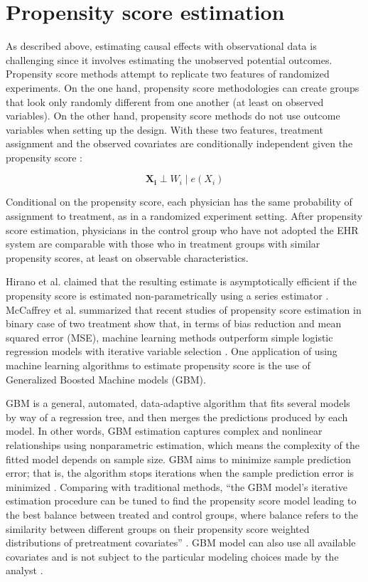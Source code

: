\documentclass[12pt]{report}
\begin{document}
\section{Propensity score estimation}
As described above, estimating causal effects with observational data is challenging since it involves estimating the unobserved potential outcomes. Propensity score methods attempt to replicate two features of randomized experiments. On the one hand, propensity score methodologies can create groups that look only randomly different from one another (at least on observed variables). On the other hand, propensity score methods do not use outcome variables when setting up the design. With these two features, treatment assignment and the observed covariates are conditionally independent given the propensity score \citep{guo2014propensity}:

\begin{equation*}
\boldsymbol{X_i} \perp W_i \mid e(X_i)
\end{equation*}

Conditional on the propensity score, each physician has the same probability of assignment to treatment, as in a randomized experiment setting. After propensity score estimation, physicians in the control group who have not adopted the EHR system are comparable with those who in treatment groups with similar propensity scores, at least on observable characteristics. 

Hirano et al. claimed that the resulting estimate is asymptotically efficient if the propensity score is estimated non-parametrically using a series estimator \citep{hirano2003efficient}. McCaffrey et al. summarized that recent studies of propensity score estimation in binary case of two treatment show that, in terms of bias reduction and mean squared error (MSE), machine learning methods outperform simple logistic regression models with iterative variable selection \citep{mccaffrey2013tutorial}. One application of using machine learning algorithms to estimate propensity score is the use of Generalized Boosted Machine models (GBM).

GBM is a general, automated, data-adaptive algorithm that fits several models by way of a regression tree, and then merges the predictions produced by each model. In other words, GBM estimation captures complex and nonlinear relationships using nonparametric estimation, which means the complexity of the fitted model depends on sample size. GBM aims to minimize sample prediction error; that is, the algorithm stops iterations when the sample prediction error is minimized \citep{guo2014propensity}. Comparing with traditional methods, ``the GBM model's iterative estimation procedure can be tuned to find the propensity score model leading to the best balance between treated and control groups, where balance refers to the similarity between different groups on their propensity score weighted distributions of pretreatment covariates''  \citep{mccaffrey2013tutorial}. GBM model can also use all available covariates and is not subject to the particular modeling choices made by the analyst \citep{hillm2015short}. 
\end{document}
